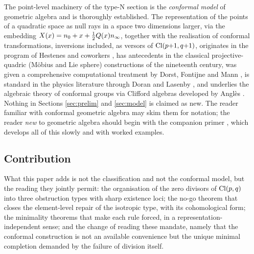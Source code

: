 The point-level machinery of the type-N section is the \emph{conformal model} of geometric algebra and is thoroughly established. The representation of the points of a quadratic space as null rays in a space two dimensions larger, via the embedding $X(x) = n_0 + x + \tfrac12 Q(x)n_\infty$, together with the realisation of conformal transformations, inversions included, as versors of $\mathrm{Cl}(p{+}1,q{+}1)$, originates in the program of Hestenes and coworkers \cite{Hestenes2001, HLR2001}, has antecedents in the classical projective-quadric (M\"obius and Lie sphere) constructions of the nineteenth century, was given a comprehensive computational treatment by Dorst, Fontijne and Mann \cite{DFM2007}, is standard in the physics literature through Doran and Lasenby \cite{DoranLasenby2003}, and underlies the algebraic theory of conformal groups via Clifford algebras developed by Angl\`es \cite{Angles2008}. Nothing in Sections \ref{sec:prelim} and \ref{sec:model} is claimed as new. The reader familiar with conformal geometric algebra may skim them for notation; the reader \emph{new} to geometric algebra should begin with the companion primer \cite{ButlerT0}, which develops all of this slowly and with worked examples.

\subsection*{Contribution}

What this paper adds is not the classification and not the conformal model, but the reading they jointly permit: the organisation of the zero divisors of $\mathrm{Cl}(p,q)$ into three obstruction types with sharp existence loci; the no-go theorem that closes the element-level repair of the isotropic type, with its cohomological form; the minimality theorems that make each rule forced, in a representation-independent sense; and the change of reading these mandate, namely that the conformal construction is not an available convenience but the unique minimal completion demanded by the failure of division itself.


